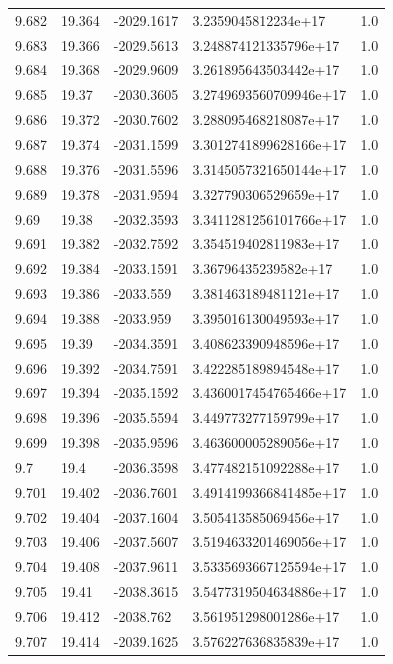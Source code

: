 \begin{tabular}{lllll}
9.682 & 19.364 & -2029.1617 & 3.2359045812234e+17 & 1.0 \\
9.683 & 19.366 & -2029.5613 & 3.248874121335796e+17 & 1.0 \\
9.684 & 19.368 & -2029.9609 & 3.261895643503442e+17 & 1.0 \\
9.685 & 19.37 & -2030.3605 & 3.2749693560709946e+17 & 1.0 \\
9.686 & 19.372 & -2030.7602 & 3.288095468218087e+17 & 1.0 \\
9.687 & 19.374 & -2031.1599 & 3.3012741899628166e+17 & 1.0 \\
9.688 & 19.376 & -2031.5596 & 3.3145057321650144e+17 & 1.0 \\
9.689 & 19.378 & -2031.9594 & 3.327790306529659e+17 & 1.0 \\
9.69 & 19.38 & -2032.3593 & 3.3411281256101766e+17 & 1.0 \\
9.691 & 19.382 & -2032.7592 & 3.354519402811983e+17 & 1.0 \\
9.692 & 19.384 & -2033.1591 & 3.36796435239582e+17 & 1.0 \\
9.693 & 19.386 & -2033.559 & 3.381463189481121e+17 & 1.0 \\
9.694 & 19.388 & -2033.959 & 3.395016130049593e+17 & 1.0 \\
9.695 & 19.39 & -2034.3591 & 3.408623390948596e+17 & 1.0 \\
9.696 & 19.392 & -2034.7591 & 3.422285189894548e+17 & 1.0 \\
9.697 & 19.394 & -2035.1592 & 3.4360017454765466e+17 & 1.0 \\
9.698 & 19.396 & -2035.5594 & 3.449773277159799e+17 & 1.0 \\
9.699 & 19.398 & -2035.9596 & 3.463600005289056e+17 & 1.0 \\
9.7 & 19.4 & -2036.3598 & 3.477482151092288e+17 & 1.0 \\
9.701 & 19.402 & -2036.7601 & 3.4914199366841485e+17 & 1.0 \\
9.702 & 19.404 & -2037.1604 & 3.505413585069456e+17 & 1.0 \\
9.703 & 19.406 & -2037.5607 & 3.5194633201469056e+17 & 1.0 \\
9.704 & 19.408 & -2037.9611 & 3.5335693667125594e+17 & 1.0 \\
9.705 & 19.41 & -2038.3615 & 3.5477319504634886e+17 & 1.0 \\
9.706 & 19.412 & -2038.762 & 3.561951298001286e+17 & 1.0 \\
9.707 & 19.414 & -2039.1625 & 3.576227636835839e+17 & 1.0 \\

\end{tabular}
